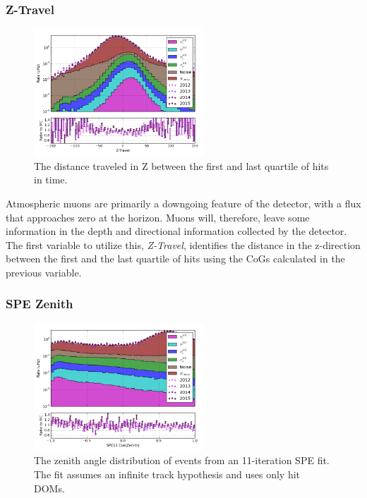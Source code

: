 \subsubsection{Z-Travel}
\begin{figure}[h]
	\centering
		\includegraphics[width=2.5in]{Z-Travel_log.png}
		\caption[Quartile Z-Travel]{The distance traveled in Z between the first and last quartile of hits in time.}
	\label{fig:quartile_ztravel}
\end{figure}

Atmospheric muons are primarily a downgoing feature of the detector, with a flux that approaches zero at the horizon.
Muons will, therefore, leave some information in the depth and directional information collected by the detector.
The first variable to utilize this, \emph{Z-Travel}, identifies the distance in the z-direction between the first and the last quartile of hits using the CoGs calculated in the previous variable.

\subsubsection{SPE Zenith}
\begin{figure}[h]
	\centering
		\includegraphics[width=2.5in]{SPE11_Cos(Zenith)_log.png}
		\caption[SPE Reconstruction Zenith Angles]{The zenith angle distribution of events from an 11-iteration SPE fit. The fit assumes an infinite track hypothesis and uses only hit DOMs.}
	\label{fig:spe11_zenith}
\end{figure}


